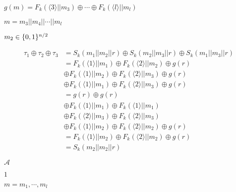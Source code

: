 \documentclass[10pt]{book}
\begin{document}
\begin{mdSnippets}
\begin{mdInlineSnippet}[1308b5bbd05f0c682089a3bd8a89617f]
$g(m) = F_k(\langle 3 \rangle || m_3) \oplus \cdots \oplus F_k(\langle l \rangle || m_l)$\end{mdInlineSnippet}%
\begin{mdInlineSnippet}[368185153c9013ecb65a59d64e061c7b]%
$m = m_3 || m_4 || \cdots|| m_l$\end{mdInlineSnippet}%
\begin{mdInlineSnippet}[16f0701b10477538d6eb5a4dd2c1e5e4]%
$m_2 \in \{0,1\}^{n/2}$\end{mdInlineSnippet}%
\begin{mdDisplaySnippet}[ec9bd3bd2cc68d7f4e924d7d999105f4]%
\[%
\begin{aligned}
\tau_1 \oplus \tau_2 \oplus \tau_3 &= S_k(m_1 || m_2 || r) \oplus S_k(m_2 || m_3 || r) \oplus S_k(m_1 || m_3 || r) \\
&= F_k(\langle 1 \rangle || m_1) \oplus F_k(\langle 2 \rangle || m_2) \oplus g(r)\\
& \oplus F_k(\langle 1 \rangle || m_2) \oplus F_k(\langle 2 \rangle || m_3) \oplus g(r) \\
&\oplus F_k(\langle 1 \rangle || m_1) \oplus F_k(\langle 2 \rangle || m_3) \oplus g(r) \\
&= g(r) \oplus g(r) \\
&\oplus F_k(\langle 1 \rangle || m_1) \oplus F_k(\langle 1 \rangle || m_1) \\
&\oplus F_k(\langle 2 \rangle || m_3) \oplus F_k(\langle 2 \rangle || m_3) \\
&\oplus F_k(\langle 1 \rangle || m_2) \oplus F_k(\langle 2 \rangle || m_2) \oplus g(r) \\
&= F_k(\langle 1 \rangle || m_2) \oplus F_k(\langle 2 \rangle || m_2) \oplus g(r)\\
&= S_k(m_2 || m_2 || r)
\end{aligned}
\]%
\end{mdDisplaySnippet}%
\begin{mdInlineSnippet}[ad70146b431bea9ae74cf8385470c544]%
$\mathcal{A}$\end{mdInlineSnippet}%
\begin{mdInlineSnippet}[c4ca4238a0b923820dcc509a6f75849b]%
$1$\end{mdInlineSnippet}%
\begin{mdInlineSnippet}[f004505f7c94fd2bfa941c6136077f5e]%
$m = m_1, \cdots, m_l$\end{mdInlineSnippet}%

\end{mdSnippets}
\end{document}
